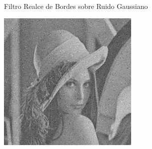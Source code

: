 \documentclass{beamer}
\begin{document}
\begin{frame}[fragile]{Filtro Realce de Bordes sobre Ruido Gaussiano}
\begin{minipage}{0.25\linewidth}
	\end{minipage}\hfill
	\begin{minipage}{0.25\linewidth}
		\centering
		\includegraphics[width=\linewidth]{../results/lena_gauss_sigma50}
	\end{minipage}
	

\end{frame}
\end{document}
